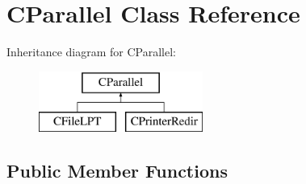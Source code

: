 \hypertarget{classCParallel}{\section{C\-Parallel Class Reference}
\label{classCParallel}
}
Inheritance diagram for C\-Parallel\-:\begin{figure}[H]
\begin{center}
\leavevmode
\includegraphics[height=2.000000cm]{classCParallel}
\end{center}
\end{figure}
\subsection*{Public Member Functions}
